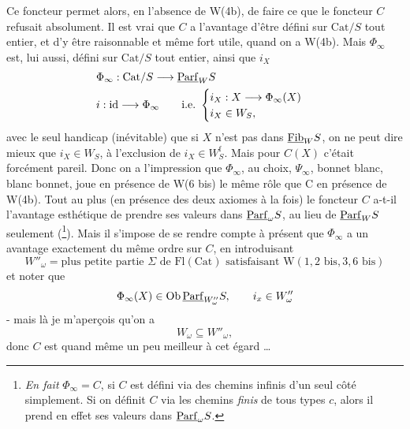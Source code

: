 Ce foncteur permet alors, en l'absence de W(4b), de faire ce que le foncteur $C$ refusait absolument. Il est vrai que $C$ a l'avantage d'être défini sur $\mathrm{Cat}/S$ tout entier, et d'y être
raisonnable et même fort utile, quand on a W(4b). Mais $\Phi_\infty$ est, lui aussi, défini sur $\mathrm{Cat}/S$ tout entier, ainsi que $i_X$
\[
\begin{aligned}
&\Phi_\infty : \mathrm{Cat}/S \longrightarrow \underline{\mathrm{Parf}}_W S\\
&i : \mathrm{id} \longrightarrow \Phi_\infty \qquad \text{i.e.}\ \begin{cases} i_X : X \longrightarrow \Phi_\infty(X)\\ i_X \in W_S, \end{cases}
\end{aligned}
\]
avec le seul handicap (inévitable) que si $X$ n'est pas dans $\underline{\mathrm{Fib}}_W S$, on ne peut dire mieux que $i_X \in W_S$, à l'exclusion de $i_X \in W_S^{\mathrm{f}}$. Mais pour $C(X)$ c'était forcément pareil. Donc on a l'impression que $\Phi_\infty$, au choix, $\Psi_\infty$, bonnet blanc, blanc bonnet, joue en présence de W(6 bis) le même rôle que C en présence de W(4b). Tout au plus (en présence des deux axiomes à la fois) le foncteur $C$ a-t-il l'avantage esthétique de prendre ses valeurs dans $\underline{\mathrm{Parf}}_\omega S$, au lieu de $\underline{\mathrm{Parf}}_W S$ seulement (\footnote[93]{\textit{En fait} $\Phi_\infty = C$, si $C$ est défini via des chemins infinis d'un seul côté simplement. Si on définit $C$ via les chemins \textit{finis} de tous types $c$, alors il prend en effet ses valeurs dans $\underline{\mathrm{Parf}}_\omega S$.}). Mais il s'impose de %
se rendre compte à présent que $\Phi_\infty$ a un avantage exactement du même ordre sur $C$, en introduisant
\[
W''_\omega = \text{plus petite partie } \Sigma \text{ de } \mathrm{Fl}(\mathrm{Cat}) \text{ satisfaisant } \mathrm{W}(1, 2\text{ bis}, 3, 6\text{ bis})
\]
et noter que
\[
\Phi_\infty(X) \in \mathrm{Ob}\,\und{Parf}_{W''_\omega} S, \qquad i_x \in W''_\omega %
\]
- mais là je m'aperçois qu'on a
\[
W_\omega \subseteq W''_\omega,
\]
donc $C$ est quand même un peu meilleur à cet égard \ldots

